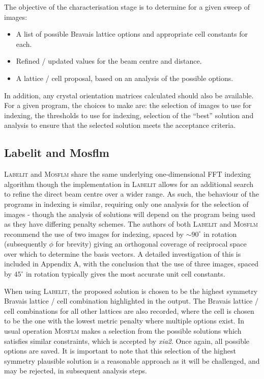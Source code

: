 \documentclass[preprint,pdf]{iucr}
\begin{document}
The objective of the characterisation stage is to determine for a
given sweep of images: 

\begin{itemize}
\item{A list of possible Bravais lattice options and appropriate cell
    constants for each.}
\item{Refined / updated values for the beam centre and distance.}
\item{A lattice / cell proposal, based on an analysis of the possible
    options.}
\end{itemize}

\noindent
In addition, any crystal orientation
matrices calculated
should also be available. For a given program, the choices to make
are: the selection of images to use for indexing, the thresholds to
use for indexing, selection of the ``best'' solution and analysis to
ensure that the selected solution meets the acceptance criteria. 

\subsection{Labelit and Mosflm}

\textsc{Labelit} and \textsc{Mosflm} share the same underlying
one-dimensional FFT indexing algorithm \cite{Steller:mf0013} though the
implementation in \textsc{Labelit} allows for an additional search to refine
the direct beam centre over a wider range. As such, the behaviour of
the programs in indexing is similar, requiring only one analysis for
the selection of images - though the analysis of solutions will depend
on the program being used as they have differing penalty schemes.
The authors of both \textsc{Labelit} and \textsc{Mosflm} recommend the
use of two images for indexing, spaced by $\sim 90^{\circ}$ in
rotation (subsequently $\phi$ for 
brevity) giving an orthogonal coverage of 
reciprocal space over which to determine the basis vectors. A detailed
investigation of this is included in Appendix A, with the conclusion
that the use of three images, spaced by $45^{\circ}$ in rotation
typically gives the most accurate unit cell constants.

When using \textsc{Labelit}, the proposed solution is chosen to be the
highest symmetry 
Bravais lattice / cell combination highlighted in the output. The
Bravais lattice / cell combinations for all other lattices are also
recorded, where the cell is chosen to be the one with the lowest
metric penalty where multiple options exist. In usual operation \textsc{Mosflm}
makes a selection from the possible solutions which satisfies similar
constraints, which is accepted by \emph{xia2}. Once again, all possible
options are saved. It is important to note that this selection of the
highest symmetry plausible solution is a reasonable approach as it will be
challenged, and may be rejected, in subsequent analysis steps.
\end{document}
